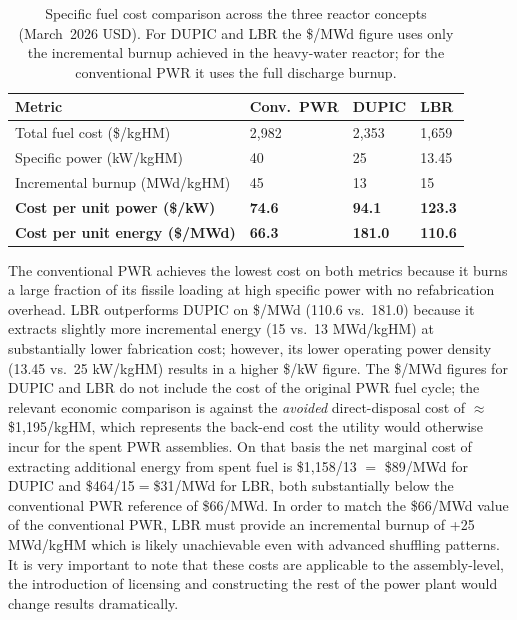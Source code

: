 \begin{table}[H]
\centering
\caption{Specific fuel cost comparison across the three reactor
  concepts (March~2026 USD).
  For DUPIC and LBR the \$/MWd figure uses only the incremental
  burnup achieved in the heavy-water reactor; for the conventional
  PWR it uses the full discharge burnup.}
\label{tab:specific-cost}
\renewcommand{\arraystretch}{1.35}
\begin{tabularx}{\linewidth}{L{4.6cm}
                              R{2.2cm} R{2.2cm} R{2.2cm}}
\toprule
\textbf{Metric}
  & \textbf{Conv.\ PWR}
  & \textbf{DUPIC}
  & \textbf{LBR} \\
\midrule
Total fuel cost (\$/kgHM)
  & 2,982 & 2,353 & 1,659 \\
Specific power (kW/kgHM)
  & 40     & 25     & 13.45  \\
Incremental burnup (MWd/kgHM)
  & 45     & 13     & 15     \\
\midrule
\textbf{Cost per unit power (\$/kW)}
  & \textbf{74.6} & \textbf{94.1} & \textbf{123.3} \\
\textbf{Cost per unit energy (\$/MWd)}
  & \textbf{66.3} & \textbf{181.0} & \textbf{110.6} \\
\bottomrule
\end{tabularx}
\end{table}

\noindent
The conventional PWR achieves the lowest cost on both metrics because it burns a large fraction of its fissile loading at high specific power with no refabrication overhead. LBR outperforms DUPIC on \$/MWd (110.6 vs.\ 181.0) because it extracts slightly more incremental energy (15 vs.\ 13 MWd/kgHM) at substantially lower fabrication cost; however, its lower operating power density (13.45 vs.\ 25 kW/kgHM) results in a higher \$/kW figure. The \$/MWd figures for DUPIC and LBR do not include the cost of the original PWR fuel cycle; the relevant economic comparison is against the \emph{avoided} direct-disposal cost of $\approx$\$1,195/kgHM, which represents the back-end cost the utility would otherwise incur for the spent PWR assemblies. On that basis the net marginal cost of extracting additional energy from spent fuel is \$1,158/13 $=$ \$89/MWd for DUPIC and \$464/15$=$\$31/MWd for LBR, both substantially below the conventional PWR reference of \$66/MWd. In order to match the \$66/MWd value of the conventional PWR, LBR must provide an incremental burnup of +25 MWd/kgHM which is likely unachievable even with advanced shuffling patterns. It is very important to note that these costs are applicable to the assembly-level, the introduction of licensing and constructing the rest of the power plant would change results dramatically.